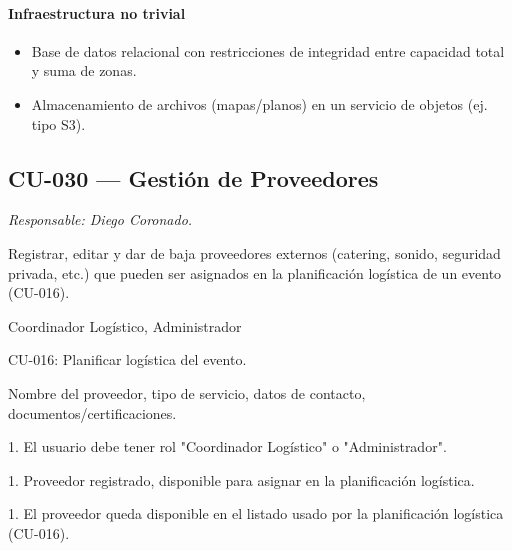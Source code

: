 \paragraph{Infraestructura no trivial}
\begin{itemize}[leftmargin=1.4em, topsep=1pt]
  \item Base de datos relacional con restricciones de integridad entre capacidad total y suma de zonas.
  \item Almacenamiento de archivos (mapas/planos) en un servicio de objetos (ej. tipo S3).
\end{itemize}

\subsection{CU-030 --- Gestión de Proveedores}
\label{cu:cu-030}
\textit{Responsable: Diego Coronado.}

\begin{description}[leftmargin=!, labelwidth=3.4cm, style=nextline, topsep=3pt]
\item[Objetivo] Registrar, editar y dar de baja proveedores externos (catering, sonido, seguridad privada, etc.) que pueden ser asignados en la planificación logística de un evento (CU-016).

\item[Actores] Coordinador Logístico, Administrador

\item[CU relacionados] CU-016: Planificar logística del evento.

\item[Entradas] Nombre del proveedor, tipo de servicio, datos de contacto, documentos/certificaciones.

\item[Pre-condiciones] 1. El usuario debe tener rol "Coordinador Logístico" o "Administrador".

\item[Salidas] 1. Proveedor registrado, disponible para asignar en la planificación logística.

\item[Post-condiciones] 1. El proveedor queda disponible en el listado usado por la planificación logística (CU-016).

\end{description}

